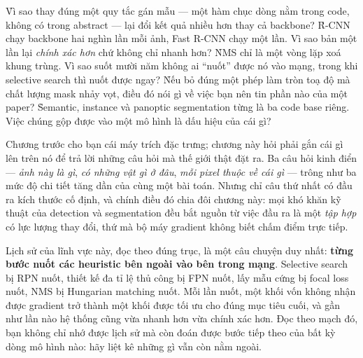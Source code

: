 \documentclass[../../deep_learning.tex]{subfiles}
\begin{document}
\begin{khoigoi}
\h{Vì sao thay đúng một quy tắc gán mẫu --- một hàm chục dòng nằm trong code, không có trong abstract --- lại đổi kết quả nhiều hơn thay cả backbone?}
\h{R-CNN chạy backbone hai nghìn lần mỗi ảnh, Fast R-CNN chạy một lần. Vì sao bản một lần lại \emph{chính xác hơn} chứ không chỉ nhanh hơn?}
\h{NMS chỉ là một vòng lặp xoá khung trùng. Vì sao suốt mười năm không ai ``nuốt'' được nó vào mạng, trong khi selective search thì nuốt được ngay?}
\h{Nếu bỏ đúng một phép làm tròn toạ độ mà chất lượng mask nhảy vọt, điều đó nói gì về việc bạn nên tin phần nào của một paper?}
\h{Semantic, instance và panoptic segmentation từng là ba code base riêng. Việc chúng gộp được vào một mô hình là dấu hiệu của cái gì?}
\end{khoigoi}

Chương trước cho bạn cái máy trích đặc trưng; chương này hỏi phải gắn cái gì lên trên nó để trả lời những câu hỏi mà thế giới thật đặt ra. Ba câu hỏi kinh điển --- \emph{ảnh này là gì}, \emph{có những vật gì ở đâu}, \emph{mỗi pixel thuộc về cái gì} --- trông như ba mức độ chi tiết tăng dần của cùng một bài toán. Nhưng chỉ câu thứ nhất có đầu ra kích thước cố định, và chính điều đó chia đôi chương này: mọi khó khăn kỹ thuật của detection và segmentation đều bắt nguồn từ việc đầu ra là một \emph{tập hợp} có lực lượng thay đổi, thứ mà bộ máy gradient không biết chấm điểm trực tiếp.

Lịch sử của lĩnh vực này, đọc theo đúng trục, là một câu chuyện duy nhất: \textbf{từng bước nuốt các heuristic bên ngoài vào bên trong mạng}. Selective search bị RPN nuốt, thiết kế đa tỉ lệ thủ công bị FPN nuốt, lấy mẫu cứng bị focal loss nuốt, NMS bị Hungarian matching nuốt. Mỗi lần nuốt, một khối vốn không nhận được gradient trở thành một khối được tối ưu cho đúng mục tiêu cuối, và gần như lần nào hệ thống cũng vừa nhanh hơn vừa chính xác hơn. Đọc theo mạch đó, bạn không chỉ nhớ được lịch sử mà còn đoán được bước tiếp theo của bất kỳ dòng mô hình nào: hãy liệt kê những gì vẫn còn nằm ngoài.
\end{document}
